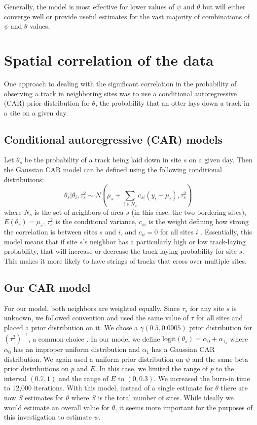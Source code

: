 \documentclass[12pt]{article}
\begin{document}
    Generally, the model is most effective for lower values of \(\psi\) and
    \(\theta\) but will either converge well or provide useful estimates for the
    vast majority of combinations of \(\psi\) and \(\theta\) values.

\section{Spatial correlation of the data}
One approach to dealing with the significant correlation in the probability of
observing a track in neighboring sites was to use a conditional autoregressive
(CAR) prior distribution for $\theta$, the probability that an otter lays down a
track in a site on a given day.

    \subsection{Conditional autoregressive (CAR) models}
    Let $\theta_s$ be the probability of a track being laid down in site $s$ on
    a given day. Then the Gaussian CAR model can be defined using the following
    conditional distributions:
    \begin{equation}
        \theta_s|\theta_i,\tau_s^2 \sim N(\mu_s+\sum_{i\in N_s}
        c_{si}(y_i-\mu_i),\tau_s^2)
    \end{equation}
    where $N_s$ is the set of neighbors of area $s$ (in this case, the two
    bordering sites), $E(\theta_s)=\mu_s$, $\tau_s^2$ is the conditional
    variance, $c_{si}$ is the weight defining how strong the correlation is
    between sites $s$ and $i$, and $c_{ii}=0$ for all sites $i$ \cite{Arab2008}.
    Essentially, this model means that if site $s$'s neighbor has a
    particularly high or low track-laying probability, that will increase or
    decrease the track-laying probability for site $s$. This makes it more
    likely to have strings of tracks that cross over multiple sites.

    \subsection{Our CAR model}
    \label{car model}
    For our model, both neighbors are weighted equally. Since $\tau_s$ for any
    site $s$ is unknown, we followed convention and used the same value of
    $\tau$ for all sites and placed a prior distribution on it. We chose a
    $\gamma(0.5,0.0005)$ prior distribution for $(\tau^2)^{-1}$, a common choice
    \cite{Thomas2004}. In our model we define $\text{logit}(\theta_s)=\alpha_0+
    \alpha_{1_s}$ where $\alpha_0$ has an improper uniform distribution and
    $\alpha_1$ has a Gaussian CAR distribution. We again used a uniform prior
    distribution on $\psi$ and the same beta prior distributions on $p$ and $E$.
    In this case, we limited the range of $p$ to the interval $(0.7,1)$ and the
    range of $E$ to $(0,0.3)$. We increased the burn-in time to 12,000
    iterations. With this model, instead of a single estimate for $\theta$ there
    are now $S$ estimates for $\theta$ where $S$ is the total number of sites.
    While ideally we would estimate an overall value for $\theta$, it seems more
    important for the purposes of this investigation to estimate $\psi$.
\end{document}
